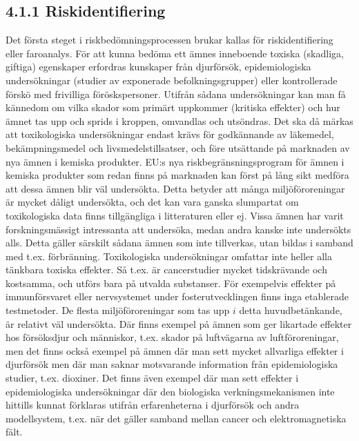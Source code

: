 \subsection*{4.1.1 Riskidentifiering}
Det första steget i riskbedömningsprocessen brukar kallas för riskidentifiering eller faroanalys. För att kunna bedöma ett ämnes inneboende toxiska (skadliga, giftiga) egenskaper erfordras kunskaper från djurförsök, epidemiologiska undersökningar (studier av exponerade befolkningsgrupper) eller kontrollerade förskö med frivilliga föröskspersoner. Utifrån sådana undersökningar kan man få kännedom om vilka skador som primärt uppkommer (kritiska effekter) och hur ämnet tas upp och sprids i kroppen, omvandlas och utsöndras.
Det ska då märkas att toxikologiska undersökningar endast krävs för godkännande av läkemedel, bekämpningsmedel och livsmedelstillsatser, och före utsättande på marknaden av nya ämnen i kemiska produkter. EU:s nya riskbegränsningsprogram för ämnen i kemiska produkter som redan finns på marknaden kan först på lång sikt medföra att dessa ämnen blir väl undersökta. Detta betyder att många miljöföroreningar är mycket dåligt undersökta, och det kan vara ganska slumpartat om toxikologiska data finns tillgängliga i litteraturen eller ej. Vissa ämnen har varit forskningsmässigt intressanta att undersöka, medan andra kanske inte undersökts alls. Detta gäller särskilt sådana ämnen som inte tillverkas, utan bildas i samband med t.ex. förbränning. Toxikologiska undersökningar omfattar inte heller alla tänkbara toxiska effekter. Så t.ex. är cancerstudier mycket tidskrävande och kostsamma, och utförs bara på utvalda substanser. För exempelvis effekter på immunförsvaret eller nervsystemet under fosterutvecklingen finns inga etablerade testmetoder.
De flesta miljöföroreningar som tas upp \(i\) detta huvudbetänkande, är relativt väl undersökta. Där finns exempel på ämnen som ger likartade effekter hos försöksdjur och människor, t.ex. skador på luftvägarna av luftföroreningar, men det finns också exempel på ämnen där man sett mycket allvarliga effekter i djurförsök men där man saknar motsvarande information från epidemiologiska studier, t.ex. dioxiner. Det finns även exempel där man sett effekter i epidemiologiska undersökningar där den biologiska verkningsmekanismen inte hittills kunnat förklaras utifrån erfarenheterna i djurförsök och andra modellsystem, t.ex. när det gäller samband mellan cancer och elektromagnetiska fält.

